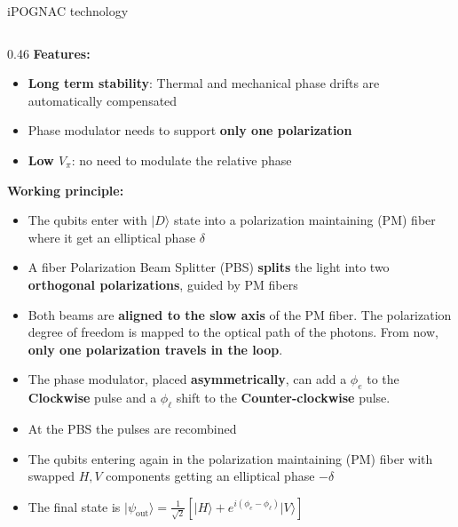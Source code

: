 \documentclass[final]{beamer}
\newcommand{\ket}[1]{\vert{#1}\rangle}
\begin{document}
\begin{frame}
\begin{textblock}{0.965}
\begin{block}{\large iPOGNAC technology }
\begin{columns}
				\begin{column}{0.46\TPHorizModule}
					\vskip -2cm
					\hskip 1cm \textbf{Features:}
					\begin{itemize}
						\item \textbf{Long term stability}: Thermal and mechanical phase drifts  are automatically compensated \\
						\item Phase modulator needs to support \textbf{only one polarization}\\
						\item \textbf{Low $V_\pi$}: no need to modulate the relative phase\\
					\end{itemize}

					\vskip1.5cm
					\textbf{\hskip1cm  Working principle: }
					\begin{itemize}
						\item The qubits enter with $\ket{D}$ state into a polarization maintaining (PM) fiber where it get an elliptical phase $\delta$  \\
						\item A fiber Polarization Beam Splitter (PBS) \textbf{splits} the light into two \textbf{orthogonal polarizations}, guided by PM fibers \\
						\item Both beams are \textbf{aligned to the slow axis} of the PM fiber. The polarization degree of freedom is mapped to the optical path of the photons. From now, \textbf{only one polarization travels in the loop}.\\
						      \vskip 0.3cm
						\item The phase modulator, placed \textbf{asymmetrically}, can add a \textbf{$\phi_e$} to the \textbf{Clockwise} pulse and a \textbf{$\phi_\ell$} shift to the \textbf{Counter-clockwise} pulse. \\

						\item At the PBS the pulses are recombined
						\item The qubits entering again in the polarization maintaining (PM) fiber with swapped $H, V$ components getting an elliptical phase $-\delta$
						\item The final state is ${\ket{\psi_\mathrm{out}}  = \frac{1}{\sqrt{2}} \left[ \ket{H} + e^{i(\phi_e-\phi_\ell)} \ket{V} \right]}$



\end{itemize}
\end{column}
\end{columns}
\end{block}
\end{textblock}
\end{frame}
\end{document}
